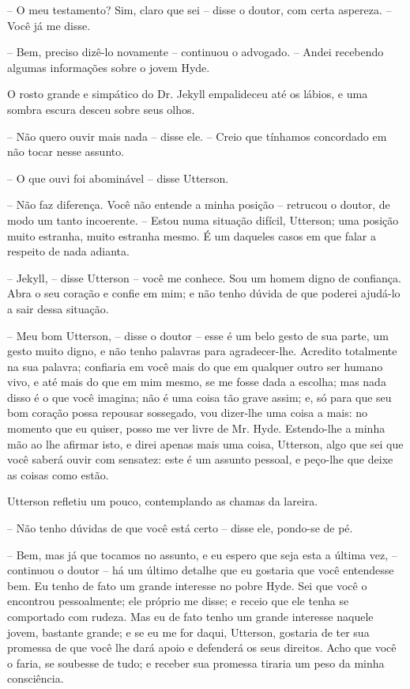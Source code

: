 -- O meu testamento? Sim, claro que sei -- disse o doutor, com certa
aspereza. -- Você já me disse.

-- Bem, preciso dizê-lo novamente -- continuou o advogado. -- Andei
recebendo algumas informações sobre o jovem Hyde.

O rosto grande e simpático do Dr. Jekyll empalideceu até os lábios, e
uma sombra escura desceu sobre seus olhos.

-- Não quero ouvir mais nada -- disse ele. -- Creio que tínhamos
concordado em não tocar nesse assunto.

-- O que ouvi foi abominável -- disse Utterson.

-- Não faz diferença. Você não entende a minha posição -- retrucou o
doutor, de modo um tanto incoerente. -- Estou numa situação difícil,
Utterson; uma posição muito estranha, muito estranha mesmo.  É um
daqueles casos em que falar a respeito de nada adianta.

-- Jekyll, -- disse Utterson -- você me conhece.  Sou um homem digno de
confiança.  Abra o seu coração e confie em mim; e não tenho dúvida de
que poderei ajudá-lo a sair dessa situação.

-- Meu bom Utterson, -- disse o doutor -- esse é um belo gesto de sua
parte, um gesto muito digno, e não tenho palavras para agradecer-lhe. 
Acredito totalmente na sua palavra; confiaria em você mais do que em
qualquer outro ser humano vivo, e até mais do que em mim mesmo, se me
fosse dada a escolha; mas nada disso é o que você imagina; não é uma
coisa tão grave assim; e, só para que seu bom coração possa repousar
sossegado, vou dizer-lhe uma coisa a mais: no momento que eu quiser,
posso me ver livre de Mr. Hyde.  Estendo-lhe a minha mão ao lhe afirmar
isto, e direi apenas mais uma coisa, Utterson, algo que sei que você
saberá ouvir com sensatez: este é um assunto pessoal, e peço-lhe que
deixe as coisas como estão.

Utterson refletiu um pouco, contemplando as chamas da lareira.

-- Não tenho dúvidas de que você está certo -- disse ele, pondo-se de
pé.

-- Bem, mas já que tocamos no assunto, e eu espero que seja esta a
última vez, -- continuou o doutor -- há um último detalhe que eu gostaria
que você entendesse bem.  Eu tenho de fato um grande interesse no pobre
Hyde.  Sei que você o encontrou pessoalmente; ele próprio me disse; e
receio que ele tenha se comportado com rudeza.  Mas eu de fato tenho um
grande interesse naquele jovem, bastante grande; e se eu me for daqui,
Utterson, gostaria de ter sua promessa de que você lhe dará apoio e
defenderá os seus direitos.  Acho que você o faria, se soubesse de
tudo; e receber sua promessa tiraria um peso da minha consciência.


